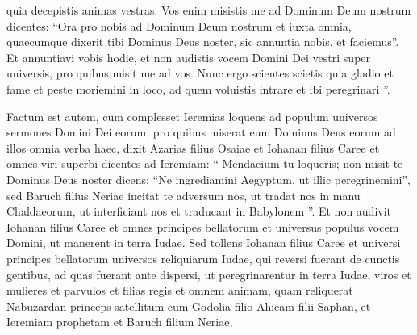 \begin{biblechapter}
\begin{biblechapter}
\begin{biblechapter}
\begin{biblechapter}
\begin{biblechapter}
\begin{biblechapter}
\begin{biblechapter}
\begin{biblechapter}
\begin{biblechapter}
\begin{biblechapter}
\begin{biblechapter}
\begin{biblechapter}
\begin{biblechapter}
\begin{biblechapter}
\begin{biblechapter}
\begin{biblechapter}
\begin{biblechapter}
\begin{biblechapter}
\begin{biblechapter}
\begin{biblechapter}
\begin{biblechapter}
\begin{biblechapter}
\begin{biblechapter}
\begin{biblechapter}
\begin{biblechapter}
\begin{biblechapter}
\begin{biblechapter}
\begin{biblechapter}
\begin{biblechapter}
\begin{biblechapter}
\begin{biblechapter}
\begin{biblechapter}
\begin{biblechapter}
\begin{biblechapter}
\begin{biblechapter}
\begin{biblechapter}
\begin{biblechapter}
\begin{biblechapter}
\begin{biblechapter}
\begin{biblechapter}
\begin{biblechapter}
\begin{biblechapter}
\verse quia decepistis animas vestras. Vos enim misistis me ad Dominum Deum nostrum dicentes: “Ora pro nobis ad Dominum Deum nostrum et iuxta omnia, quaecumque dixerit tibi Dominus Deus noster, sic annuntia nobis, et faciemus”. 
\verse Et annuntiavi vobis hodie, et non audistis vocem Domini Dei vestri super universis, pro quibus misit me ad vos. 
\verse Nunc ergo scientes scietis quia gladio et fame et peste moriemini in loco, ad quem voluistis intrare et ibi peregrinari ”.
 
\begin{biblechapter}
\verse Factum est autem, cum complesset Ieremias loquens ad populum universos sermones Domini Dei eorum, pro quibus miserat eum Dominus Deus eorum ad illos omnia verba haec, 
\verse dixit Azarias filius Osaiae et Iohanan filius Caree et omnes viri superbi dicentes ad Ieremiam: “ Mendacium tu loqueris; non misit te Dominus Deus noster dicens: “Ne ingrediamini Aegyptum, ut illic peregrinemini”, 
\verse sed Baruch filius Neriae incitat te adversum nos, ut tradat nos in manu Chaldaeorum, ut interficiant nos et traducant in Babylonem ”.
 \verse Et non audivit Iohanan filius Caree et omnes principes bellatorum et universus populus vocem Domini, ut manerent in terra Iudae. 
\verse Sed tollens Iohanan filius Caree et universi principes bellatorum universos reliquiarum Iudae, qui reversi fuerant de cunctis gentibus, ad quas fuerant ante dispersi, ut peregrinarentur in terra Iudae, 
\verse viros et mulieres et parvulos et filias regis et omnem animam, quam reliquerat Nabuzardan princeps satellitum cum Godolia filio Ahicam filii Saphan, et Ieremiam prophetam et Baruch filium Neriae, 

\end{biblechapter}
\end{biblechapter}
\end{biblechapter}
\end{biblechapter}
\end{biblechapter}
\end{biblechapter}
\end{biblechapter}
\end{biblechapter}
\end{biblechapter}
\end{biblechapter}
\end{biblechapter}
\end{biblechapter}
\end{biblechapter}
\end{biblechapter}
\end{biblechapter}
\end{biblechapter}
\end{biblechapter}
\end{biblechapter}
\end{biblechapter}
\end{biblechapter}
\end{biblechapter}
\end{biblechapter}
\end{biblechapter}
\end{biblechapter}
\end{biblechapter}
\end{biblechapter}
\end{biblechapter}
\end{biblechapter}
\end{biblechapter}
\end{biblechapter}
\end{biblechapter}
\end{biblechapter}
\end{biblechapter}
\end{biblechapter}
\end{biblechapter}
\end{biblechapter}
\end{biblechapter}
\end{biblechapter}
\end{biblechapter}
\end{biblechapter}
\end{biblechapter}
\end{biblechapter}
\end{biblechapter}
